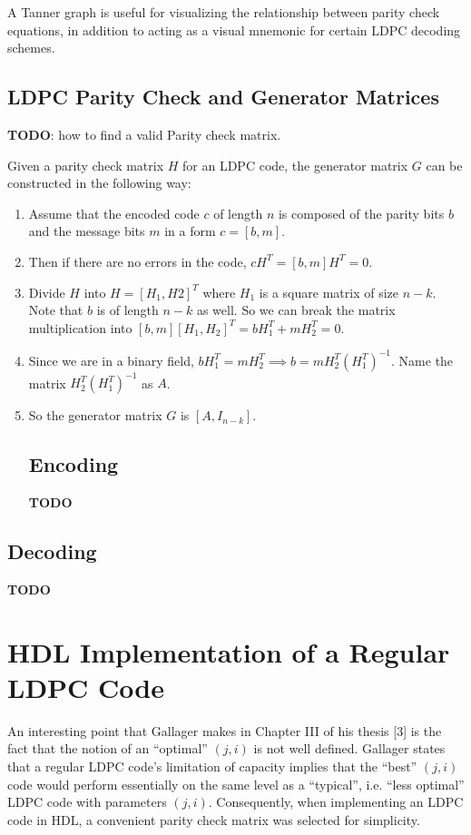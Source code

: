 \documentclass[conference]{IEEEtran}
\begin{document}
A Tanner graph is useful for visualizing the relationship between parity check equations, in addition to acting as a visual mnemonic for certain LDPC decoding schemes.

\subsection{LDPC Parity Check and Generator Matrices}
\textbf{TODO}: how to find a valid Parity check matrix.

Given a parity check matrix $H$ for an LDPC code, the generator matrix $G$ can
be constructed in the following way:
\begin{enumerate}
  \item Assume that the encoded code $c$ of length $n$ is composed of the parity bits
        $b$ and the message bits $m$ in a form $c = [b, m]$.
  \item Then if there are no errors in the code, $cH^T = [b, m]H^T = 0$.
  \item Divide $H$ into $H = [H_1, H2]^T$ where $H_1$ is a square matrix of size $n-k$.
        Note that $b$ is of length $n-k$ as well. So we can break the matrix
        multiplication into $[b, m][H_1, H_2]^T = bH_1^T + mH_2^T = 0$.
  \item Since we are in a binary field, $bH_1^T = mH_2^T \implies b =
          mH_2^T(H_1^T)^{-1}$. Name the matrix $H_2^T(H_1^T)^{-1}$ as $A$.
  \item So the generator matrix $G$ is $[A, I_{n-k}]$.

\subsection{Encoding}
\textbf{TODO}
\end{enumerate}

\subsection{Decoding}
\textbf{TODO}

\section{HDL Implementation of a Regular LDPC Code}
An interesting point that Gallager makes in Chapter III of his thesis [3] is the fact that the notion of an ``optimal'' $(j,i)$ is not well defined.
Gallager states that a regular LDPC code's limitation of capacity implies that the ``best'' $(j,i)$ code would perform essentially on the same level as a ``typical'', i.e. ``less optimal'' LDPC code with parameters $(j,i)$.
Consequently, when implementing an LDPC code in HDL, a convenient parity check matrix was selected for simplicity.
\end{document}
